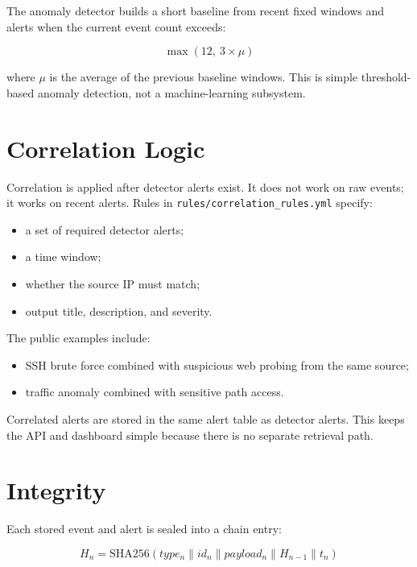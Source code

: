 \documentclass[11pt,a4paper]{article}
\begin{document}
The anomaly detector builds a short baseline from recent fixed windows and alerts when the current event count exceeds:

\begin{equation}
\max(12,\ 3 \times \mu)
\end{equation}

where $\mu$ is the average of the previous baseline windows. This is simple threshold-based anomaly detection, not a machine-learning subsystem.

\section{Correlation Logic}

Correlation is applied after detector alerts exist. It does not work on raw events; it works on recent alerts. Rules in \texttt{rules/correlation\_rules.yml} specify:

\begin{itemize}[leftmargin=1.5em]
  \item a set of required detector alerts;
  \item a time window;
  \item whether the source IP must match;
  \item output title, description, and severity.
\end{itemize}

The public examples include:

\begin{itemize}[leftmargin=1.5em]
  \item SSH brute force combined with suspicious web probing from the same source;
  \item traffic anomaly combined with sensitive path access.
\end{itemize}

Correlated alerts are stored in the same alert table as detector alerts. This keeps the API and dashboard simple because there is no separate retrieval path.

\section{Integrity}

Each stored event and alert is sealed into a chain entry:

\begin{equation}
H_n = \mathrm{SHA256}(type_n \parallel id_n \parallel payload_n \parallel H_{n-1} \parallel t_n)
\end{equation}
\end{document}
